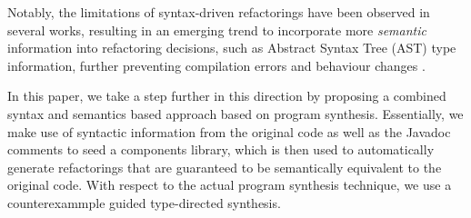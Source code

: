 \documentclass[runningheads,a4paper]{llncs}
\begin{document}
%
%


Notably, the limitations of syntax-driven refactorings have been observed
in several works, resulting in an emerging trend to incorporate more {\em semantic}
information into refactoring decisions, such as Abstract Syntax Tree (AST) 
type information,
further preventing compilation errors and behaviour changes
\cite{Steimann2011,Steimann2012Pilgrim,Steimann2011KollePilgrim}.

In this paper, we take a step further in this direction by proposing a
combined syntax and semantics based approach based on program
synthesis.  Essentially, we make use of syntactic information from the
original code as well as the Javadoc comments to seed a components
library, which is then used to automatically generate refactorings
that are guaranteed to be semantically equivalent to the original
code.  With respect to the actual program synthesis technique, we use
a counterexammple guided type-directed synthesis.
\end{document}
